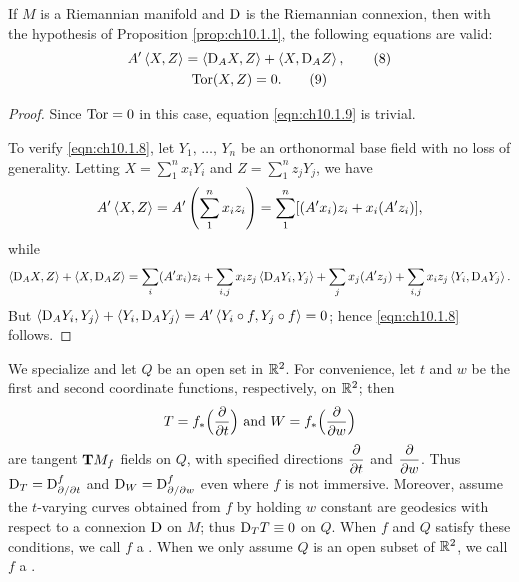 \documentclass[../main]{subfiles}
\begin{document}
\begin{proposition} \label{prop:ch10.1.3}
If $M$ is a Riemannian manifold and $\mathrm{D}$ is the Riemannian connexion, then with the hypothesis of Proposition \eqref{prop:ch10.1.1}, the following equations are valid:
    \begin{gather}
    A' \left\langle X,Z\right\rangle = \left\langle\mathrm{D}_A X,Z\right\rangle+\left\langle X,\mathrm{D}_A Z\right\rangle,
    \label{eqn:ch10.1.8}\tag{8} \\
    \mathrm{Tor}(X,Z)=0.
    \label{eqn:ch10.1.9}\tag{9}
    \end{gather}
\end{proposition}

\begin{proof}
Since $\mathrm{Tor}=0$ in this case, equation \eqref{eqn:ch10.1.9} is trivial.

To verify \eqref{eqn:ch10.1.8}, let $Y_1,\, \hdots,\, Y_n$ be an orthonormal base field with no loss of generality. Letting $X=\displaystyle\sum_1^n x_i Y_i$ and $Z=\displaystyle\sum_1^n z_j Y_j$, we have
\[
A'\left\langle X,Z\right\rangle
=
A'\left( \sum_1^n x_iz_i \right)
=
\sum_1^n [(A'x_i)z_i+x_i(A'z_i)],
\]
while
\[
\left\langle\mathrm{D}_A X,Z\right\rangle+\left\langle X,\mathrm{D}_A Z\right\rangle
=
\sum_i (A' x_i) z_i
    + \sum_{i,j} x_iz_j \left\langle\mathrm{D}_A Y_i,Y_j\right\rangle
    + \sum_j x_j(A'z_j)
    + \sum_{i,j} x_iz_j \left\langle Y_i,\mathrm{D}_A Y_j\right\rangle.
\]
But $\left\langle\mathrm{D}_A Y_i,Y_j\right\rangle+\left\langle Y_i,\mathrm{D}_A Y_j\right\rangle=A'\left\langle Y_i\circ f,Y_j\circ f\right\rangle=0$; hence \eqref{eqn:ch10.1.8} follows.
\end{proof}



We specialize and let $Q$ be an open set in $\mathbb{R}^2$. For convenience, let $t$ and $w$ be the first and second coordinate functions, respectively, on $\mathbb{R}^2$; then \[T=f_\ast\Big(\dfrac{\partial }{\partial t}\Big)\text{ and } W=f_\ast\Big(\dfrac{\partial }{\partial w}\Big)\] are tangent $\mathbf{T}M_f$ fields on $Q$, with specified directions $\dfrac{\partial }{\partial t}$ and $\dfrac{\partial }{\partial w}$. Thus $\mathrm{D}_T=\mathrm{D}^f_{\partial/\partial t}$ and $\mathrm{D}_W=\mathrm{D}^f_{\partial/\partial w}$ even where $f$ is not immersive. Moreover, assume the $t$-varying curves obtained from $f$ by holding $w$ constant are geodesics with respect to a connexion $\mathrm{D}$ on $M$; thus $\mathrm{D}_T T \equiv 0$ on $Q$. When $f$ and $Q$ satisfy these conditions, we call $f$ a . When we only assume $Q$ is an open subset of $\mathbb{R}^2$, we call $f$ a .
\end{document}
